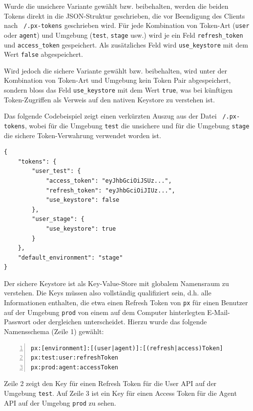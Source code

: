 Wurde die unsichere Variante gewählt bzw. beibehalten, werden die beiden Tokens direkt in die JSON-Struktur geschrieben, die vor Beendigung des Clients nach \texttt{~/.px-tokens} geschrieben wird. Für jede Kombination von Token-Art (\texttt{user} oder \texttt{agent}) und Umgebung (\texttt{test}, \texttt{stage} usw.) wird je ein Feld \texttt{refresh\_token} und \texttt{access\_token} gespeichert. Als zusätzliches Feld wird \texttt{use\_keystore} mit dem Wert \texttt{false} abgespeichert.

Wird jedoch die sichere Variante gewählt bzw. beibehalten, wird unter der Kombination von Token-Art und Umgebung kein Token Pair abgespeichert, sondern bloss das Feld \texttt{use\_keystore} mit dem Wert \texttt{true}, was bei künftigen Token-Zugriffen als Verweis auf den nativen Keystore zu verstehen ist.

Das folgende Codebeispiel zeigt einen verkürzten Auszug aus der Datei \texttt{~/.px-tokens}, wobei für die Umgebung \texttt{test} die unsichere und für die Umgebung \texttt{stage} die sichere Token-Verwahrung verwendet worden ist.

\begin{lstlisting}[caption={Die JSON-Struktur für den Keystore (Auszug)}]
{
	"tokens": {
		"user_test": {
			"access_token": "eyJhbGciOiJSUz...",
			"refresh_token": "eyJhbGciOiJIUz...",
			"use_keystore": false
		},
		"user_stage": {
			"use_keystore": true
		}
	},
	"default_environment": "stage"
}
\end{lstlisting}

Der sichere Keystore ist als Key-Value-Store mit globalem Namensraum zu verstehen. Die Keys müssen also vollständig qualifiziert sein, d.h. alle Informationen enthalten, die etwa einen Refresh Token von \texttt{px} für einen Benutzer auf der Umgebung \texttt{prod} von einem auf dem Computer hinterlegten E-Mail-Passwort oder dergleichen unterscheidet. Hierzu wurde das folgende Namensschema (Zeile 1) gewählt:

\begin{lstlisting}[caption={Namensschema für die Keys auf dem nativen Keystore (mit Beispielen)},numbers=left]
px:[environment]:[(user|agent)]:[(refresh|access)Token]
px:test:user:refreshToken
px:prod:agent:accessToken
\end{lstlisting}

Zeile 2 zeigt den Key für einen Refresh Token für die User API auf der Umgebung \texttt{test}. Auf Zeile 3 ist ein Key für einen Access Token für die Agent API auf der Umgebng \texttt{prod} zu sehen.

